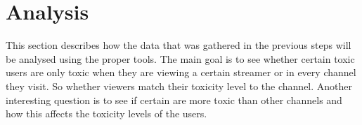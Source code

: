 \documentclass[final]{report}
\begin{document}
\chapter{Analysis}
\label{ch:analysis}

This section describes how the data that was gathered in the previous steps will be analysed using the proper tools. The main goal is to see whether certain toxic users are only toxic when they are viewing a certain streamer or in every channel they visit. So whether viewers match their toxicity level to the channel. Another interesting question is to see if certain are more toxic than other channels and how this affects the toxicity levels of the users.
\end{document}
